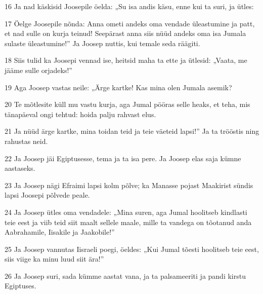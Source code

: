 \par 16 Ja nad käskisid Joosepile öelda: „Su isa andis käsu, enne kui ta suri, ja ütles:
\par 17 Öelge Joosepile nõnda: Anna ometi andeks oma vendade üleastumine ja patt, et nad sulle on kurja teinud! Seepärast anna siis nüüd andeks oma isa Jumala sulaste üleastumine!” Ja Joosep nuttis, kui temale seda räägiti.
\par 18 Siis tulid ka Joosepi vennad ise, heitsid maha ta ette ja ütlesid: „Vaata, me jääme sulle orjadeks!”
\par 19 Aga Joosep vastas neile: „Ärge kartke! Kas mina olen Jumala asemik?
\par 20 Te mõtlesite küll mu vastu kurja, aga Jumal pööras selle heaks, et teha, mis tänapäeval ongi tehtud: hoida palju rahvast elus.
\par 21 Ja nüüd ärge kartke, mina toidan teid ja teie väeteid lapsi!” Ja ta trööstis ning rahustas neid.
\par 22 Ja Joosep jäi Egiptusesse, tema ja ta isa pere. Ja Joosep elas saja kümne aastaseks.
\par 23 Ja Joosep nägi Efraimi lapsi kolm põlve; ka Manasse pojast Maakirist sündis lapsi Joosepi põlvede peale.
\par 24 Ja Joosep ütles oma vendadele: „Mina suren, aga Jumal hoolitseb kindlasti teie eest ja viib teid siit maalt sellele maale, mille ta vandega on tõotanud anda Aabrahamile, Iisakile ja Jaakobile!”
\par 25 Ja Joosep vannutas Iisraeli poegi, öeldes: „Kui Jumal tõesti hoolitseb teie eest, siis viige ka minu luud siit ära!”
\par 26 Ja Joosep suri, sada kümme aastat vana, ja ta palsameeriti ja pandi kirstu Egiptuses.





